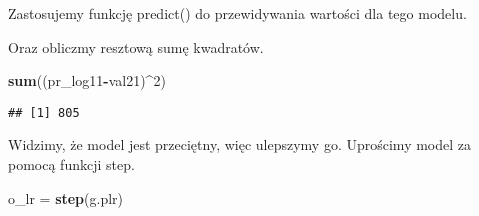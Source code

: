\documentclass[
]{article}
\newenvironment{Shaded}{\begin{snugshade}}{\end{snugshade}}
\newcommand{\AttributeTok}[1]{\textcolor[rgb]{0.13,0.29,0.53}{#1}}
\newcommand{\DecValTok}[1]{\textcolor[rgb]{0.00,0.00,0.81}{#1}}
\newcommand{\FunctionTok}[1]{\textcolor[rgb]{0.13,0.29,0.53}{\textbf{#1}}}
\newcommand{\NormalTok}[1]{#1}
\newcommand{\OtherTok}[1]{\textcolor[rgb]{0.56,0.35,0.01}{#1}}
\newcommand{\SpecialCharTok}[1]{\textcolor[rgb]{0.81,0.36,0.00}{\textbf{#1}}}
\newcommand{\StringTok}[1]{\textcolor[rgb]{0.31,0.60,0.02}{#1}}
\begin{document}
Zastosujemy funkcję predict() do przewidywania wartości dla tego modelu.

\begin{Shaded}
\end{Shaded}

Oraz obliczmy resztową sumę kwadratów.

\begin{Shaded}
\begin{Highlighting}[]
\FunctionTok{sum}\NormalTok{((pr\_log11}\SpecialCharTok{{-}}\NormalTok{val21)}\SpecialCharTok{\^{}}\DecValTok{2}\NormalTok{)}
\end{Highlighting}
\end{Shaded}

\begin{verbatim}
## [1] 805
\end{verbatim}

Widzimy, że model jest przeciętny, więc ulepszymy go. Uprościmy model za
pomocą funkcji step.

\begin{Shaded}
\begin{Highlighting}[]
\NormalTok{o\_lr }\OtherTok{=} \FunctionTok{step}\NormalTok{(g.plr)}
\end{Highlighting}
\end{Shaded}
\end{document}
